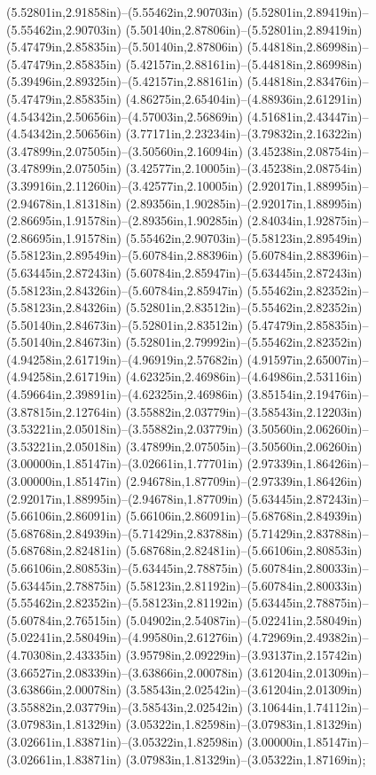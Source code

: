 (5.52801in,2.91858in)--(5.55462in,2.90703in) (5.52801in,2.89419in)--(5.55462in,2.90703in) (5.50140in,2.87806in)--(5.52801in,2.89419in) (5.47479in,2.85835in)--(5.50140in,2.87806in) (5.44818in,2.86998in)--(5.47479in,2.85835in) (5.42157in,2.88161in)--(5.44818in,2.86998in) (5.39496in,2.89325in)--(5.42157in,2.88161in) (5.44818in,2.83476in)--(5.47479in,2.85835in) (4.86275in,2.65404in)--(4.88936in,2.61291in) (4.54342in,2.50656in)--(4.57003in,2.56869in) (4.51681in,2.43447in)--(4.54342in,2.50656in) (3.77171in,2.23234in)--(3.79832in,2.16322in) (3.47899in,2.07505in)--(3.50560in,2.16094in) (3.45238in,2.08754in)--(3.47899in,2.07505in) (3.42577in,2.10005in)--(3.45238in,2.08754in) (3.39916in,2.11260in)--(3.42577in,2.10005in) (2.92017in,1.88995in)--(2.94678in,1.81318in) (2.89356in,1.90285in)--(2.92017in,1.88995in) (2.86695in,1.91578in)--(2.89356in,1.90285in) (2.84034in,1.92875in)--(2.86695in,1.91578in) (5.55462in,2.90703in)--(5.58123in,2.89549in) (5.58123in,2.89549in)--(5.60784in,2.88396in) (5.60784in,2.88396in)--(5.63445in,2.87243in) (5.60784in,2.85947in)--(5.63445in,2.87243in) (5.58123in,2.84326in)--(5.60784in,2.85947in) (5.55462in,2.82352in)--(5.58123in,2.84326in) (5.52801in,2.83512in)--(5.55462in,2.82352in) (5.50140in,2.84673in)--(5.52801in,2.83512in) (5.47479in,2.85835in)--(5.50140in,2.84673in) (5.52801in,2.79992in)--(5.55462in,2.82352in) (4.94258in,2.61719in)--(4.96919in,2.57682in) (4.91597in,2.65007in)--(4.94258in,2.61719in) (4.62325in,2.46986in)--(4.64986in,2.53116in) (4.59664in,2.39891in)--(4.62325in,2.46986in) (3.85154in,2.19476in)--(3.87815in,2.12764in) (3.55882in,2.03779in)--(3.58543in,2.12203in) (3.53221in,2.05018in)--(3.55882in,2.03779in) (3.50560in,2.06260in)--(3.53221in,2.05018in) (3.47899in,2.07505in)--(3.50560in,2.06260in) (3.00000in,1.85147in)--(3.02661in,1.77701in) (2.97339in,1.86426in)--(3.00000in,1.85147in) (2.94678in,1.87709in)--(2.97339in,1.86426in) (2.92017in,1.88995in)--(2.94678in,1.87709in) (5.63445in,2.87243in)--(5.66106in,2.86091in) (5.66106in,2.86091in)--(5.68768in,2.84939in) (5.68768in,2.84939in)--(5.71429in,2.83788in) (5.71429in,2.83788in)--(5.68768in,2.82481in) (5.68768in,2.82481in)--(5.66106in,2.80853in) (5.66106in,2.80853in)--(5.63445in,2.78875in) (5.60784in,2.80033in)--(5.63445in,2.78875in) (5.58123in,2.81192in)--(5.60784in,2.80033in) (5.55462in,2.82352in)--(5.58123in,2.81192in) (5.63445in,2.78875in)--(5.60784in,2.76515in) (5.04902in,2.54087in)--(5.02241in,2.58049in) (5.02241in,2.58049in)--(4.99580in,2.61276in) (4.72969in,2.49382in)--(4.70308in,2.43335in) (3.95798in,2.09229in)--(3.93137in,2.15742in) (3.66527in,2.08339in)--(3.63866in,2.00078in) (3.61204in,2.01309in)--(3.63866in,2.00078in) (3.58543in,2.02542in)--(3.61204in,2.01309in) (3.55882in,2.03779in)--(3.58543in,2.02542in) (3.10644in,1.74112in)--(3.07983in,1.81329in) (3.05322in,1.82598in)--(3.07983in,1.81329in) (3.02661in,1.83871in)--(3.05322in,1.82598in) (3.00000in,1.85147in)--(3.02661in,1.83871in) (3.07983in,1.81329in)--(3.05322in,1.87169in);
